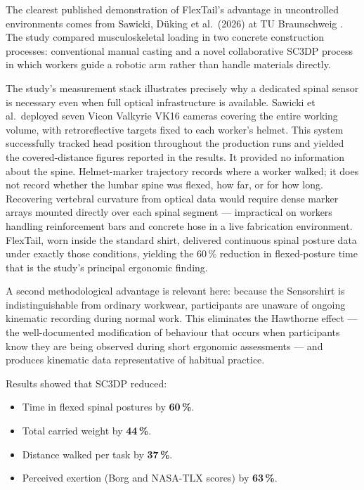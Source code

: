 The clearest published demonstration of FlexTail's advantage in uncontrolled
environments comes from Sawicki, D{\"u}king et al.\ (2026) at TU Braunschweig
\cite{sawicki2026}.
The study compared musculoskeletal loading in two concrete construction processes:
conventional manual casting and a novel collaborative \ac{SC3DP}
process in which workers guide a robotic arm rather than handle materials directly.

The study's measurement stack illustrates precisely why a dedicated spinal sensor is
necessary even when full optical infrastructure is available.
Sawicki et al.\ deployed seven Vicon Valkyrie VK16 cameras covering the entire working
volume, with retroreflective targets fixed to each worker's helmet.
This system successfully tracked head position throughout the production runs and
yielded the covered-distance figures reported in the results.
It provided no information about the spine.
Helmet-marker trajectory records where a worker walked; it does not record whether
the lumbar spine was flexed, how far, or for how long.
Recovering vertebral curvature from optical data would require dense marker arrays
mounted directly over each spinal segment --- impractical on workers handling
reinforcement bars and concrete hose in a live fabrication environment.
FlexTail, worn inside the standard shirt, delivered continuous spinal posture data
under exactly those conditions, yielding the 60\,\% reduction in flexed-posture time
that is the study's principal ergonomic finding.

A second methodological advantage is relevant here: because the Sensorshirt is
indistinguishable from ordinary workwear, participants are unaware of ongoing kinematic
recording during normal work.
This eliminates the Hawthorne effect --- the well-documented modification of behaviour
that occurs when participants know they are being observed during short ergonomic
assessments --- and produces kinematic data representative of habitual practice.

Results showed that \acs{SC3DP} reduced:

\begin{itemize}
	\item Time in flexed spinal postures by \textbf{60\,\%}.
	\item Total carried weight by \textbf{44\,\%}.
	\item Distance walked per task by \textbf{37\,\%}.
	\item Perceived exertion (Borg and NASA-TLX scores) by \textbf{63\,\%}.
\end{itemize}

